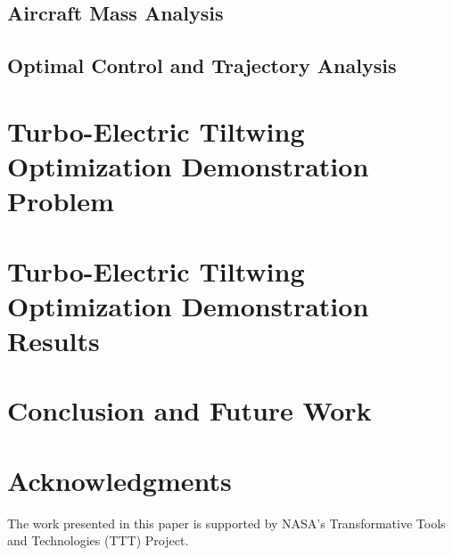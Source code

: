 \documentclass[conf]{new-aiaa}
\begin{document}
\subsection{Aircraft Mass Analysis}

\subsection{Optimal Control and Trajectory Analysis}



\section{Turbo-Electric Tiltwing Optimization Demonstration Problem}\label{sec:opt_prob}

\section{Turbo-Electric Tiltwing Optimization Demonstration Results}\label{sec:opt_results}

\section{Conclusion and Future Work}\label{sec:conc}


\section*{Acknowledgments}
The work presented in this paper is supported by NASA's Transformative Tools and Technologies (TTT) Project.  


\end{document}
